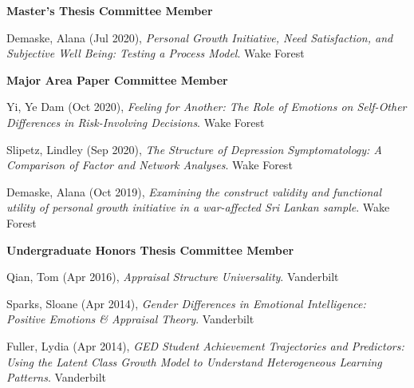 {\large\textbf{Master's Thesis Committee Member}}
\begin{etaremune}%
\item Demaske, Alana (Jul 2020), \textit{Personal Growth Initiative, Need Satisfaction, and Subjective Well Being: Testing a Process Model}. Wake Forest%
\end{etaremune}%
%
{\large\textbf{Major Area Paper Committee Member}}
\begin{etaremune}%
\item Yi, Ye Dam (Oct 2020), \textit{Feeling for Another: The Role of Emotions on Self-Other Differences in Risk-Involving Decisions}. Wake Forest%
\item Slipetz, Lindley (Sep 2020), \textit{The Structure of Depression Symptomatology: A Comparison of Factor and Network Analyses}. Wake Forest%
\item Demaske, Alana (Oct 2019), \textit{Examining the construct validity and functional utility of personal growth initiative in a war-affected Sri Lankan sample}. Wake Forest%
\end{etaremune}%
%
{\large\textbf{Undergraduate Honors Thesis Committee Member}}
\begin{etaremune}
\item Qian, Tom (Apr 2016), \textit{Appraisal Structure Universality}. Vanderbilt%
%
\item Sparks, Sloane (Apr 2014), \textit{Gender Differences in Emotional Intelligence: Positive Emotions \& Appraisal Theory}. Vanderbilt%
\item Fuller, Lydia (Apr 2014), \textit{GED Student Achievement Trajectories and Predictors: Using the Latent Class Growth Model to Understand Heterogeneous Learning Patterns}. Vanderbilt%
\end{etaremune}
